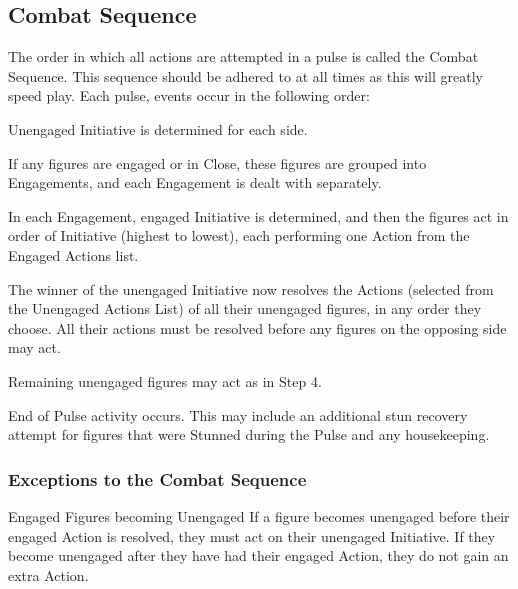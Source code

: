 \begin{multicols*}{3}
\subsection{Combat Sequence}

The order in which all actions are attempted in a pulse is called the
Combat Sequence. This sequence should be adhered to at all times as
this will greatly speed play. Each pulse, events occur in the
following order:

\begin{Enumerate}
\item Unengaged Initiative is determined for each side.

\item If any figures are engaged or in Close, these figures are
grouped into Engagements, and each Engagement is dealt with
separately.

\item In each Engagement, engaged Initiative is determined, and then
the figures act in order of Initiative (highest to lowest), each
performing one Action from the Engaged Actions list.

\item The winner of the unengaged Initiative now resolves the Actions
(selected from the Unengaged Actions List) of all their unengaged
figures, in any order they choose. All their actions must be resolved
before any figures on the opposing side may act.

\item Remaining unengaged figures may act as in Step 4.

\item
End of Pulse activity occurs. This may include an additional stun
recovery attempt for figures that were Stunned during the Pulse and
any housekeeping.

\end{Enumerate}

\subsubsection{Exceptions to the Combat Sequence}

\begin{Description}

\item[Engaged Figures becoming Unengaged] If a figure becomes
unengaged before their engaged Action is resolved, they must act on
their unengaged Initiative. If they become unengaged after they have
had their engaged Action, they do not gain an extra Action.


\end{Description}
\end{multicols*}
